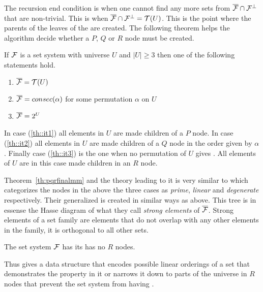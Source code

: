 The recursion end condition is when one cannot find any more sets from
$\overline{{\cal F}} \cap {\cal F}^{\bot}$ that are non-trivial. This is when $\overline{{\cal F}} \cap {\cal F}^{\bot} = {\cal T}(U)$. This is the
point where the parents of the leaves of the \PQRtree are created. The
following theorem helps the algorithm decide whether a $P$, $Q$ or
$R$ node must be created.

\begin{theoremsansproof}
\label{th:pqrfinalmm}
If ${\cal F}$ is a set system with universe $U$ and $|U| \ge 3$ then one of
the following statements hold.
\begin{enumerate}
\item \label{th::it1} $\overline{{\cal F}} = {\cal T}(U)$ 
\item \label{th::it2}$\overline{{\cal F}} = consec(\alpha)$ for
  some permutation $\alpha$ on $U$ 
\item \label{th::it3}$\overline{{\cal F}} = 2^{U}$ 
\end{enumerate}
\end{theoremsansproof}

In case (\ref{th::it1}) all elements in $U$ are made children of a
$P$ node. In case (\ref{th::it2}) all elements in $U$ are made
children of a $Q$ node in the order given by $\alpha$. Finally case
(\ref{th::it3}) is the one when no permutation of $U$ gives \COP. All
elements of $U$ are in this case made children in an $R$ node. 

Theorem~\ref{th:pqrfinalmm} and the theory leading to it is very
similar to \cite[Th.~2.1, 3.5. Also Th.~3.2, 3.3, 3.4]{mcc04} which categorizes
the nodes in the above the three cases as {\em prime}, {\em linear}
and {\em degenerate} respectively. Their generalized \PQtree is
created in similar ways as \PQRtree above. This tree is in essense the
Hasse diagram of what they call {\em strong elements} of
$\overline{{\cal F}}$. Strong elements of a set family are elements that do
not overlap with any other elements in the family, \ie it is
orthogonal to all other sets\cite[Def.~3.3]{mcc04}.


\begin{theoremsansproof}
The set system ${\cal F}$ has \COP \iff its \PQRtree has no $R$ nodes.  
\end{theoremsansproof}

Thus \PQRtree gives a data structure that encodes possible linear
orderings of a set that demonstrates the \COP property in it or
narrows it down to parts of the universe in $R$ nodes that prevent the
set system from having \COP.

